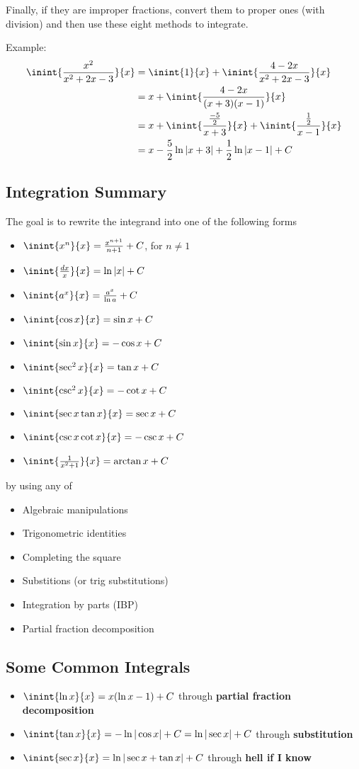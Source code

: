 \documentclass[12pt]{article}
\begin{document}
Finally, if they are improper fractions, convert them to proper ones (with division) and then use these eight methods to integrate.

Example:
\begin{align*}
\inint{\frac{x^2}{x^2+2x-3}}{x} &= \inint{1}{x} + \inint{\frac{4-2x}{x^2+2x-3}}{x}\\
&= x + \inint{\frac{4-2x}{(x+3)(x-1)}}{x}\\
&= x + \inint{\frac{\frac{-5}{2}}{x+3}}{x} + \inint{\frac{\frac{1}{2}}{x-1}}{x}\\
&= x - \frac{5}{2}\ln|x+3| + \frac{1}{2}\ln|x-1| + C
\end{align*}

\subsection*{Integration Summary}
The goal is to rewrite the integrand into one of the following forms
\begin{itemize}
\item $\inint{x^n}{x} = \frac{x^{n+1}}{n+1} + C$, for $n \neq 1$
\item $\inint{\frac{dx}{x}}{x} = \ln|x| + C$
\item $\inint{a^x}{x} = \frac{a^x}{\ln a} + C$
\item $\inint{\cos x}{x} = \sin x + C$
\item $\inint{\sin x}{x} = -\cos x + C$
\item $\inint{\sec^2 x}{x} = \tan x + C$
\item $\inint{\csc^2 x}{x} = -\cot x + C$
\item $\inint{\sec x\tan x}{x} = \sec x + C$
\item $\inint{\csc x\cot x}{x} = -\csc x + C$
\item $\inint{\frac{1}{x^2+1}}{x} = \arctan x + C$
\end{itemize}
by using any of
\begin{itemize}
\item Algebraic manipulations
\item Trigonometric identities
\item Completing the square
\item Substitions (or trig substitutions)
\item Integration by parts (IBP)
\item Partial fraction decomposition
\end{itemize}

\subsection*{Some Common Integrals}
\begin{itemize}
\item $\inint{\ln x}{x} = x(\ln x - 1) + C$ through {\bf partial fraction decomposition}
\item $\inint{\tan x}{x} = -\ln |\cos x| + C = \ln |\sec x| + C$ through {\bf substitution}
\item $\inint{\sec x}{x} = \ln |\sec x + \tan x| + C$ through {\bf hell if I know}
\end{itemize}
\end{document}
